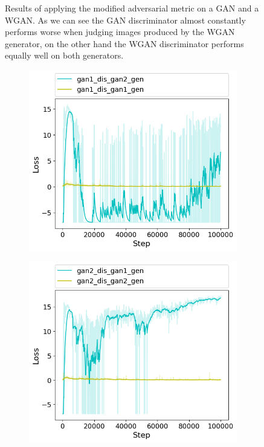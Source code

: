 \begin{figure}[h]
\begin{subfigure}[b]{0.5\textwidth}
	\end{subfigure}
	\caption{Results of applying the modified adversarial metric on a GAN and a WGAN. As we can see the GAN discriminator almost constantly performs worse when judging images produced by the WGAN generator, on the other hand the WGAN discriminator performs equally well on both generators.}
	\label{fig:cd_wgan_vs_gan}
\end{figure}

\begin{figure}[h]
	\begin{subfigure}[b]{0.5\textwidth}
		\includegraphics[width=\textwidth]{figures/cross_dis/trial15_gan1_dis_gan2_gen}
	\end{subfigure}
	\begin{subfigure}[b]{0.5\textwidth}
		\includegraphics[width=\textwidth]{figures/cross_dis/trial15_gan2_dis_gan1_gen}

\end{subfigure}
\end{figure}
